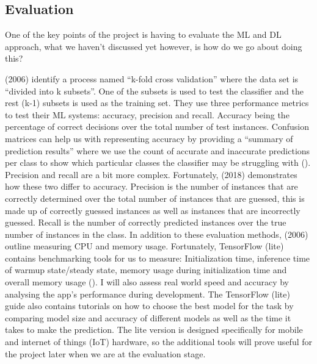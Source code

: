 \documentclass{article}
\begin{document}
\subsection{Evaluation}
\label{subsec:evaluation}

One of the key points of the project is having to evaluate the ML and DL approach, what we haven't discussed 
yet however, is how do we go about doing this?

\par

\citeauthor{10.1145/1163593.1163596} (2006) identify a process named “k-fold cross validation” where the data set is 
“divided into k subsets”. One of the subsets is used to test the classifier and the rest (k-1) subsets is used as the 
training set. They use three performance metrics to test their ML systems: accuracy, precision and recall. Accuracy 
being the percentage of correct decisions over the total number of test instances. Confusion matrices can help us with 
representing accuracy by providing a “summary of prediction results” where we use the count of accurate and inaccurate 
predictions per class to show which particular classes the classifier may be struggling with (\cite{Brownlee2020b}). 
Precision and recall are a bit more complex. 
Fortunately, \citeauthor{shung2018} (2018) demonstrates how these two differ to accuracy. Precision is the number of 
instances that are correctly determined over the total number of instances that are guessed, this is made up of 
correctly guessed instances as well as instances that are incorrectly guessed. Recall is the number of correctly 
predicted instances over the true number of instances in the class. In addition to these evaluation methods, 
\citeauthor{10.1145/1163593.1163596} (2006) outline measuring CPU and memory usage. Fortunately, TensorFlow (lite) 
contains benchmarking tools for us to measure: Initialization time, inference time of warmup state/steady state, memory 
usage during initialization time and overall memory usage (\cite{googleTF}). I will also assess real world speed and 
accuracy by analysing the app's performance during development. The TensorFlow (lite) guide also contains tutorials on 
how to choose the best model for the task by comparing model size and accuracy of different models as well as the time 
it takes to make the prediction. The lite version is designed specifically for mobile and internet of things (IoT) 
hardware, so the additional tools will prove useful for the project later when we are at the evaluation stage.
\end{document}
